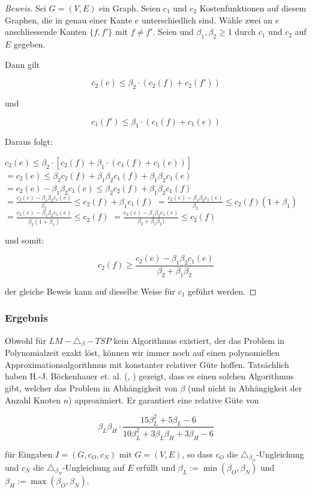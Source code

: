 \documentclass[a4paper,11pt]{scrreprt}
\begin{document}
\begin{proof}[Beweis]
Sei $G = (V, E)$ ein Graph. Seien $c_1$ und $c_2$ Kostenfunktionen auf diesem Graphen, die in genau einer Kante $e$ unterschiedlich sind. Wähle zwei an $e$ anschliessende Kanten $\{f, f'\}$ mit $f \not= f'$. Seien und $\beta_1, \beta_2 \ge 1$ durch $c_1$ und $c_2$ auf $E$ gegeben. 

Dann gilt

\[ c_2(e) \le \beta_2 \cdot (c_2(f) + c_2(f')) \]

und 

\[ c_1(f') \le \beta_1 \cdot (c_1(f) + c_1(e)) \]

Daraus folgt:

$ c_2(e) \le \beta_2 \cdot [c_2(f) + \beta_1 \cdot (c_1(f) + c_1(e))] $ $ = c_2(e) \le \beta_2 c_2(f) + \beta_1\beta_2 c_1(f) + \beta_1\beta_2 c_1(e) $ $ = c_2(e) - \beta_1\beta_2 c_1(e) \le \beta_2 c_2(f) + \beta_1\beta_2 c_1(f) $ $ = \frac{c_2(e) - \beta_1\beta_2 c_1(e)}{\beta_2} \le c_2(f) + \beta_1 c_1(f) $ $ = \frac{c_2(e) - \beta_1\beta_2 c_1(e)}{\beta_2} \le c_2(f)(1 + \beta_1) $ $ = \frac{c_2(e) - \beta_1\beta_2 c_1(e)}{\beta_2(1 + \beta_1)} \le c_2(f) $ $ = \frac{c_2(e) - \beta_1\beta_2 c_1(e)}{\beta_2 + \beta_1\beta_2)} \le c_2(f) $

und somit:

\[ c_2(f) \ge  \frac{c_2(e) - \beta_1\beta_2 c_1(e)}{\beta_2 + \beta_1\beta_2} \]

der gleiche Beweis kann auf dieselbe Weise für $c_1$ geführt werden.
\end{proof}

\subsubsection{Ergebnis}

Obwohl für $LM-\triangle_\beta-TSP$ kein Algorithmus existiert, der das Problem in Polynomialzeit exakt löst, können wir immer noch auf einen polynomiellen Approximationsalgorithmus mit konstanter relativer Güte hoffen. Tatsächlich haben H.-J. Böckenhauer et. al. (\cite{bok1}, \cite{bok2}) gezeigt, dass es einen solchen Algorithmus gibt, welcher das Problem in Abhängigkeit von $\beta$ (und nicht in Abhängigkeit der Anzahl Knoten $n$) approximiert. Er garantiert eine  relative Güte von

\[ \beta_L\beta_H \cdot \frac{15\beta_L^2 + 5\beta_L - 6}{10\beta_L^2 + 3\beta_L\beta_H + 3\beta_H -6} \]

für Eingaben $I = (G, c_O, c_N)$ mit $G = (V, E)$, so dass $c_O$ die $\triangle_{\beta_O}$-Ungleichung und $c_N$ die $\triangle_{\beta_N}$-Ungleichung auf $E$ erfüllt und $\beta_L := \min(\beta_O,\beta_N)$ und $\beta_H := \max(\beta_O,\beta_N)$. 
\end{document}
